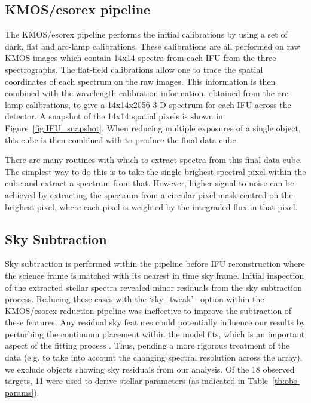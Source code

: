 \subsection{KMOS/esorex pipeline} %
\label{sub:kmos_esorex_pipeline}

The KMOS/esorex pipeline performs the initial calibrations by using a set of dark, flat and arc-lamp calibrations.
These calibrations are all performed on raw KMOS images which contain 14x14 spectra from each IFU from the three spectrographs.
The flat-field calibrations allow one to trace the spatial coordinates of each spectrum on the raw images.
This information is then combined with the wavelength calibration information,
obtained from the arc-lamp calibrations, to give a 14x14x2056 3-D spectrum for each IFU across the detector.
A snapshot of the 14x14 spatial pixels is shown in Figure~\ref{fig:IFU_snapshot}.
When reducing multiple exposures of a single object, this cube is then combined with to produce the final data cube.

There are many routines with which to extract spectra from this final data cube.
The simplest way to do this is to take the single brighest spectral pixel within the cube and extract a spectrum from that.
However, higher signal-to-noise can be achieved by extracting the spectrum from a circular pixel mask centred on the brighest pixel, where each pixel is weighted by the integraded flux in that pixel.


\subsection{Sky Subtraction} %
\label{sub:sky_subtraction}

Sky subtraction is performed within the pipeline before IFU reconstruction where the science frame is matched with its nearest in time sky frame.
Initial inspection of the extracted stellar spectra revealed minor residuals from the sky subtraction process.
Reducing these cases with the \textquoteleft sky\_tweak\textquoteright
~option within the KMOS/esorex reduction pipeline was ineffective to improve the subtraction of these features.
Any residual sky features could potentially influence our results by perturbing the continuum placement within the model fits, which is an important aspect of the fitting process
\citep[see][for more discussion]{2014ApJ...788...58G,Davies-prep}.
Thus, pending a more rigorous treatment of the data
(e.g. to take into account the changing spectral resolution across the array),
we exclude objects showing sky residuals from our analysis.
Of the 18 observed targets, 11 were used to derive stellar parameters
(as indicated in Table~\ref{tb:obs-params}).

